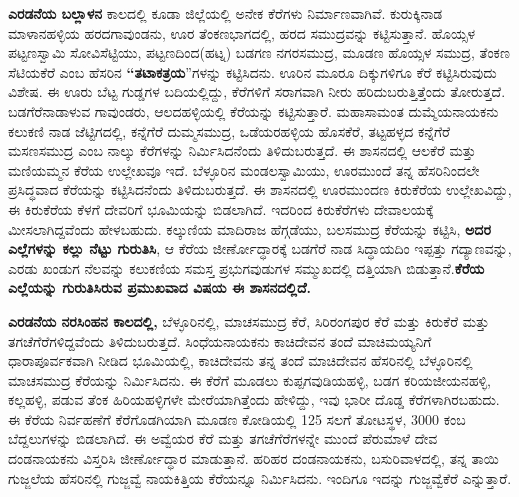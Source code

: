 \textbf{ಎರಡನೆಯ ಬಲ್ಲಾಳನ} ಕಾಲದಲ್ಲಿ ಕೂಡಾ ಜಿಲ್ಲೆಯಲ್ಲಿ ಅನೇಕ ಕೆರೆಗಳು ನಿರ್ಮಾಣವಾಗಿವೆ. ಕುರುಕ್ಕಿನಾಡ ಮಾಳಾನಹಳ್ಳಿಯ ಹರದಗಾವುಂಡನು, ಊರ ತೆಂಕಣಭಾಗದಲ್ಲಿ, ಹರದ ಸಮುದ್ರವನ್ನು ಕಟ್ಟಿಸುತ್ತಾನೆ. ಹೊಯ್ಸಳ ಪಟ್ಟಣಸ್ವಾಮಿ ಸೋವಿಸೆಟ್ಟಿಯು, ಪಟ್ಟಣದಿಂದ(ಹಟ್ನ) ಬಡಗಣ ನಗರಸಮುದ್ರ, ಮೂಡಣ ಹೊಯ್ಸಳ ಸಮುದ್ರ, ತೆಂಕಣ ಸೆಟಿಯಕೆರೆ ಎಂಬ ಹೆಸರಿನ \textbf{“ತಟಾಕತ್ರಯ}”ಗಳನ್ನು ಕಟ್ಟಿಸಿದನು. ಊರಿನ ಮೂರೂ ದಿಕ್ಕುಗಳಿಗೂ ಕೆರೆ ಕಟ್ಟಿಸಿರುವುದು ವಿಶೇಷ. ಈ ಊರು ಬೆಟ್ಟ ಗುಡ್ಡಗಳ ಬದಿಯಲ್ಲಿದ್ದು, ಕೆರೆಗಳಿಗೆ ಸರಾಗವಾಗಿ ನೀರು ಹರಿದುಬರುತ್ತಿತ್ತೆಂದು ತೋರುತ್ತದೆ. ಬಡಗೆರೆನಾಡಾಳುವ ಗಾವುಂಡರು, ಆಲದಹಳ್ಳಿಯಲ್ಲಿ ಕೆರೆಯನ್ನು ಕಟ್ಟಿಸುತ್ತಾರೆ. ಮಹಾಸಾಮಂತ ದುಮ್ಮೆಯನಾಯಕನು ಕಲುಕಣಿ ನಾಡ ಜೆಟ್ಟಿಗದಲ್ಲಿ, ಕನ್ನೆಗೆರೆ ದುಮ್ಮಸಮುದ್ರ, ಒಡೆಯರಹಳ್ಳಿಯ ಹೊಸಕೆರೆ, ತಟ್ಟಹಳ್ಳದ ಕನ್ನೆಗೆರೆ ಮಸಣಸಮುದ್ರ ಎಂಬ ನಾಲ್ಕು ಕೆರೆಗಳನ್ನು ನಿರ್ಮಿಸಿದನೆಂದು ತಿಳಿದುಬರುತ್ತದೆ. ಈ ಶಾಸನದಲ್ಲಿ ಆಲಕೆರೆ ಮತ್ತು ಮಣಿಯಮ್ಮನ ಕೆರೆಯ ಉಲ್ಲೇಖವೂ ಇದೆ. ಬೆಳ್ಳೂರಿನ ಮಂಡಲಸ್ವಾಮಿಯು, ಊರಮುಂದೆ ತನ್ನ ಹೆಸರಿನಿಂದಲೇ ಪ್ರಸಿದ್ಧವಾದ ಕೆರೆಯನ್ನು ಕಟ್ಟಿಸಿದನೆಂದು ತಿಳಿದುಬರುತ್ತದೆ. ಈ ಶಾಸನದಲ್ಲಿ ಊರಮುಂದಣ ಕಿರುಕೆರೆಯ ಉಲ್ಲೇಖವಿದ್ದು, ಈ ಕಿರುಕೆರೆಯ ಕೆಳಗೆ ದೇವರಿಗೆ ಭೂಮಿಯನ್ನು ಬಿಡಲಾಗಿದೆ. ಇದರಿಂದ ಕಿರುಕೆರೆಗಳು ದೇವಾಲಯಕ್ಕೆ ಮೀಸಲಾಗಿದ್ದವೆಂದು ಹೇಳಬಹುದು. ಕಲ್ಕುಣಿಯ ಮಾದಿರಾಜ ಹೆಗ್ಗಡೆಯು, ಬಲಸಮುದ್ರ ಕೆರೆಯನ್ನು ಕಟ್ಟಿಸಿ, \textbf{ಅದರ ಎಲ್ಲೆಗಳನ್ನು ಕಲ್ಲು ನೆಟ್ಟು ಗುರುತಿಸಿ}, ಆ ಕೆರೆಯ ಜೀರ್ಣೋದ್ಧಾರಕ್ಕೆ ಬಡಗೆರೆ ನಾಡ ಸಿದ್ಧಾಯದಿಂ ಇಪ್ಪತ್ತು ಗದ್ಯಾಣವನ್ನು, ಎರಡು ಖಂಡುಗ ನೆಲವನ್ನು ಕಲುಕಣಿಯ ಸಮಸ್ತ ಪ್ರಭುಗವುಡುಗಳ ಸಮ್ಮುಖದಲ್ಲಿ ದತ್ತಿಯಾಗಿ ಬಿಡುತ್ತಾನೆ.\textbf{ಕೆರೆಯ ಎಲ್ಲೆಯನ್ನು ಗುರುತಿಸಿರುವ ಪ್ರಮುಖವಾದ ವಿಷಯ ಈ ಶಾಸನದಲ್ಲಿದೆ.}

\textbf{ಎರಡನೆಯ ನರಸಿಂಹನ ಕಾಲದಲ್ಲಿ,} ಬೆಳ್ಳೂರಿನಲ್ಲಿ, ಮಾಚಸಮುದ್ರ ಕೆರೆ, ಸಿರಿರಂಗಪುರ ಕೆರೆ ಮತ್ತು ಕಿರುಕೆರೆ ಮತ್ತು ತಗಚೆಗೆರೆಗಳಿದ್ದವೆಂದು ತಿಳಿದುಬರುತ್ತದೆ. ಸಿಂಧೆಯನಾಯಕನು ಕಾಚಿದೇವನ ತಂದೆ ಮಾಚಿಮಯ್ಯನಿಗೆ ಧಾರಾಪೂರ್ವಕವಾಗಿ ನೀಡಿದ ಭೂಮಿಯಲ್ಲಿ, ಕಾಚಿದೇವನು ತನ್ನ ತಂದೆ ಮಾಚಿದೇವನ ಹೆಸರಿನಲ್ಲಿ ಬೆಳ್ಳೂರಿನಲ್ಲಿ ಮಾಚಸಮುದ್ರ ಕೆರೆಯನ್ನು ನಿರ್ಮಿಸಿದನು. ಈ ಕೆರೆಗೆ ಮೂಡಲು ಕುಪ್ಪಗವುಡಿಯಹಳ್ಳಿ, ಬಡಗ ಕರಿಯಜೀಯನಹಳ್ಳಿ, ಕಲ್ಲಹಳ್ಳಿ, ಪಡುವ ತೆಂಕ ಹಿರಿಯಹಳ್ಳಿಗಳೇ ಮೇರೆಯಾಗಿತ್ತೆಂದು ಹೇಳಿದ್ದು, ಇವು ಭಾರೀ ದೊಡ್ಡ ಕೆರೆಗಳಾಗಿರಬಹುದು. ಈ ಕೆರೆಯ ನಿರ್ವಹಣೆಗೆ ಕೆರೆಗೊಡಗಿಯಾಗಿ ಮೂಡಣ ಕೋಡಿಯಲ್ಲಿ 125 ಸಲಗೆ ತೋಟಸ್ಥಳ, 3000 ಕಂಬ ಬೆದ್ದಲುಗಳನ್ನು ಬಿಡಲಾಗಿದೆ. ಈ ಅವ್ವೆಯರ ಕೆರೆ ಮತ್ತು ತಗಚೆಗೆರೆಗಳನ್ನೇ ಮುಂದೆ ಪೆರುಮಾಳೆ ದೇವ ದಂಡನಾಯಕನು ವಿಸ್ತರಿಸಿ ಜೀರ್ಣೋದ್ಧಾರ ಮಾಡುತ್ತಾನೆ. ಹರಿಹರ ದಂಡನಾಯಕನು, ಬಸುರಿವಾಳದಲ್ಲಿ, ತನ್ನ ತಾಯಿ ಗುಜ್ಜಲೆಯ ಹೆಸರಿನಲ್ಲಿ ಗುಜ್ಜವ್ವೆ ನಾಯಕಿತ್ತಿಯ ಕೆರೆಯನ್ನೂ ನಿರ್ಮಿಸಿದನು. ಇಂದಿಗೂ ಇದನ್ನು ಗುಜ್ಜವ್ವೆಕೆರೆ ಎನ್ನುತ್ತಾರೆ.

